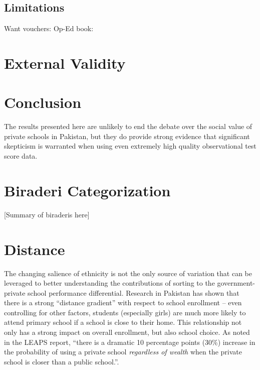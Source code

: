 \documentclass[12pt]{article}
\begin{document}
\subsection{Limitations}\label{}


Want vouchers: \citep{Chakrabarti:2008vc}
Op-Ed \citep{Kelkar:2006tq}
book: \citep{Panagariya:2008wi}




\section{External Validity}\label{}


\section{Conclusion}\label{conclusion}
The results presented here are unlikely to end the debate over the social value of private schools in Pakistan, but they do provide strong evidence that significant skepticism is warranted when using even extremely high quality observational test score data.

\pagebreak

	
	

\pagebreak

\appendix


\section{Biraderi Categorization}\label{biraderis}

[Summary of biraderis here]



\section{Distance}\label{distance}
The changing salience of ethnicity is not the only source of variation that can be leveraged to better understanding the contributions of sorting to the government-private school performance differential. Research in Pakistan has shown that there is a strong ``distance gradient'' with respect to school enrollment -- even controlling for other factors, students (especially girls) are much more likely to attend primary school if a school is close to their home. This relationship not only has a strong impact on overall enrollment, but also school choice. As noted in the LEAPS report, ``there is a dramatic 10 percentage points (30\%) increase in the probability of using a private school \emph{regardless of wealth} when the private school is closer than a public school.''\citep[p.96]{Andrabi:2007we}. 
\end{document}

